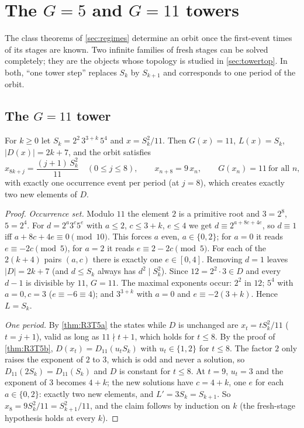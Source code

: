 \section{The \texorpdfstring{$G=5$}{G=5} and \texorpdfstring{$G=11$}{G=11} towers}\label{sec:towers}
The class theorems of \cref{sec:regimes} determine an orbit once the first-event times of its stages are known. Two infinite families of fresh stages can be solved completely; they are the objects whose topology is studied in \cref{sec:towertop}. In both, ``one tower step'' replaces $S_k$ by $S_{k+1}$ and corresponds to one period of the orbit.

\subsection{The \texorpdfstring{$G=11$}{G=11} tower}
\begin{theorem}[$\ell=11$: period $8$, multiplier $9$]\label{thm:R3T5bp}
For $k\ge0$ let $S_k=2^2\,3^{3+k}\,5^4$ and $x=S_k^2/11$. Then $G(x)=11$, $L(x)=S_k$, $|D(x)|=2k+7$, and the orbit satisfies
\[
x_{8k+j}=\frac{(j+1)\,S_k^2}{11}\quad(0\le j\le8),\qquad x_{n+8}=9\,x_n,\qquad G(x_n)=11\ \text{for all }n,
\]
with exactly one occurrence event per period (at $j=8$), which creates exactly two new elements of $D$.
\end{theorem}
\begin{proof}
\emph{Occurrence set.} Modulo $11$ the element $2$ is a primitive root and $3=2^8$, $5=2^4$. For $d=2^a3^c5^e$ with $a\le2$, $c\le3+k$, $e\le4$ we get $d\equiv2^{a+8c+4e}$, so $d\equiv1$ iff $a+8c+4e\equiv0\pmod{10}$. This forces $a$ even, $a\in\{0,2\}$; for $a=0$ it reads $e\equiv-2c\pmod5$, for $a=2$ it reads $e\equiv2-2c\pmod5$. For each of the $2(k+4)$ pairs $(a,c)$ there is exactly one $e\in[0,4]$. Removing $d=1$ leaves $|D|=2k+7$ (and $d\le S_k$ always has $d^2\mid S_k^2$). Since $12=2^2\cdot3\in D$ and every $d-1$ is divisible by $11$, $G=11$. The maximal exponents occur: $2^2$ in $12$; $5^4$ with $a=0,c=3$ ($e\equiv-6\equiv4$); and $3^{3+k}$ with $a=0$ and $e\equiv-2(3+k)$. Hence $L=S_k$.

\emph{One period.} By \cref{thm:R3T5a} the states while $D$ is unchanged are $x_t=tS_k^2/11$ ($t=j+1$), valid as long as $11\nmid t+1$, which holds for $t\le8$. By the proof of \cref{thm:R3T5b}, $D(x_t)=D_{11}(u_tS_k)$ with $u_t\in\{1,2\}$ for $t\le8$. The factor $2$ only raises the exponent of $2$ to $3$, which is odd and never a solution, so $D_{11}(2S_k)=D_{11}(S_k)$ and $D$ is constant for $t\le8$. At $t=9$, $u_t=3$ and the exponent of $3$ becomes $4+k$; the new solutions have $c=4+k$, one $e$ for each $a\in\{0,2\}$: exactly two new elements, and $L'=3S_k=S_{k+1}$. So $x_8=9S_k^2/11=S_{k+1}^2/11$, and the claim follows by induction on $k$ (the fresh-stage hypothesis holds at every $k$). \qedhere
\end{proof}
